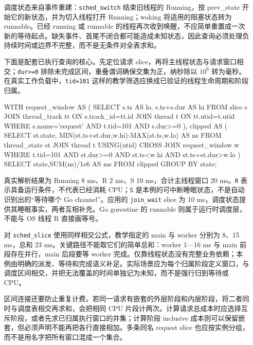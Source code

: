 \documentclass[UTF8,fontset=fandol,openany,11pt]{ctexbook}
\begin{document}
调度状态来自事件重建：\texttt{sched\_\allowbreak{}switch} 结束旧线程的 Running，按 prev\_\allowbreak{}state 开始它的新状态，并为切入线程打开 Running；waking 将适用的阻塞状态转为 runnable。已经 running 或 runnable 的线程再次收到唤醒，不应简单重置成一次新的等待起点。缺失事件、首尾不闭合都可能造成未知状态，因此查询必须处理负持续时间或边界不完整，而不是无条件对全表求和。\cite{pf-thread-state}


下面是配套已执行查询的核心。先定位请求 slice，再将主线程状态与请求窗口相交；\texttt{dur>=0} 排除未完成区间，重叠谓词确保交集为正，纳秒除以 \(10^6\) 转为毫秒。在真实工作负载中，\texttt{tid=101} 这样的教学筛选应换成已验证的线程生命周期和阶段归属。\cite{pf-request}



\begin{codeblock}
WITH request_window AS (
  SELECT s.ts AS lo, s.ts+s.dur AS hi
  FROM slice s JOIN thread_track tt ON s.track_id=tt.id
  JOIN thread t ON tt.utid=t.utid
  WHERE s.name='request' AND t.tid=101 AND s.dur>=0
), clipped AS (
  SELECT st.state, MIN(st.ts+st.dur,w.hi)-MAX(st.ts,w.lo) AS ns
  FROM thread_state st JOIN thread t USING(utid)
  CROSS JOIN request_window w
  WHERE t.tid=101 AND st.dur>=0
    AND st.ts<w.hi AND st.ts+st.dur>w.lo
)
SELECT state,SUM(ns)/1e6 AS ms FROM clipped GROUP BY state;
\end{codeblock}

真实解析结果为 Running 8 ms、R 2 ms、S 10 ms，合计主线程窗口 20 ms。\texttt{R} 表示具备运行条件，不代表已经消耗 CPU；\texttt{S} 是本例的可中断睡眠状态，不是自动识别出的“等待哪个 Go channel”。应用的 \texttt{join\_\allowbreak{}wait} slice 为 10 ms，调度状态提供其睡眠事实，两者互相补充。Go goroutine 的 runnable 则属于运行时调度层，不能与 OS 线程 R 直接画等号。\cite{pf-thread-state}\cite{pf-request}


对 \texttt{sched\_\allowbreak{}slice} 使用同样相交公式，教学指定的 main 与 worker 分别为 8、15 ms，总和 23 ms。关键路径不能取它们的简单总和：worker 1—16 ms 与 main 前段存在并行，main 后段要等 worker 完成。仅靠线程状态没有完整业务依赖；本例由明确的派发、等待和完成语义补足。实际场景应为每个归属阶段定义窗口，与调度区间相交，并把无法覆盖的时间单独记为未知，而不是强行归到等待或 CPU。


区间连接还要防止重复计费。若同一请求有嵌套的外层阶段和内层阶段，将二者同时与调度表相交再求和，会把相同 CPU 片段计两次。计算请求总成本时应选择互斥阶段，或者先求已归属执行窗口的并集；计算阶段 inclusive 成本则可以保留嵌套，但必须声明不能再把各行直接相加。多条同名 request slice 也应按实例分组，而不是用名字把所有窗口混成一个集合。
\end{document}
